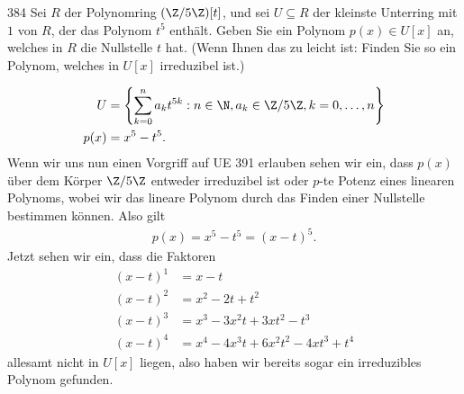 \begin{algebraUE}{384}
Sei $R$ der Polynomring $(\Z/5\Z)[t]$, und sei $U \subseteq R$ der kleinste
Unterring mit $1$ von $R$, der das Polynom $t^5$ enthält. Geben Sie ein Polynom
$p(x) \in U[x]$ an, welches in $R$ die Nullstelle $t$ hat. (Wenn Ihnen das zu
leicht ist: Finden Sie so ein Polynom, welches in $U[x]$ irreduzibel ist.)
\end{algebraUE}

\begin{solution}
\begin{align*}
  U &= \left\{\sum_{k = 0}^na_kt^{5k}: n \in \N, a_k \in \Z/5\Z, k = 0,\dots,n\right\} \\
  p(x) &= x^5 - t^5.
\end{align*}
Wenn wir uns nun einen Vorgriff auf UE 391 erlauben sehen wir ein, dass $p(x)$
über dem Körper $\Z/5\Z$
entweder irreduzibel ist oder $p$-te Potenz eines linearen Polynoms, wobei
wir das lineare Polynom durch das Finden einer Nullstelle bestimmen können. Also gilt
\begin{align*}
  p(x) = x^5 - t^5 = (x - t)^5.
\end{align*}
Jetzt sehen wir ein, dass die Faktoren
\begin{align*}
  (x - t)^1 &= x - t \\
  (x - t)^2 &= x^2 - 2t + t^2 \\
  (x - t)^3 &= x^3 -3x^2t + 3xt^2 - t^3 \\
  (x - t)^4 &= x^4 -4x^3t + 6x^2t^2 - 4xt^3 + t^4
\end{align*}
allesamt nicht in $U[x]$ liegen, also haben wir bereits sogar ein irreduzibles
Polynom gefunden.
\end{solution}
